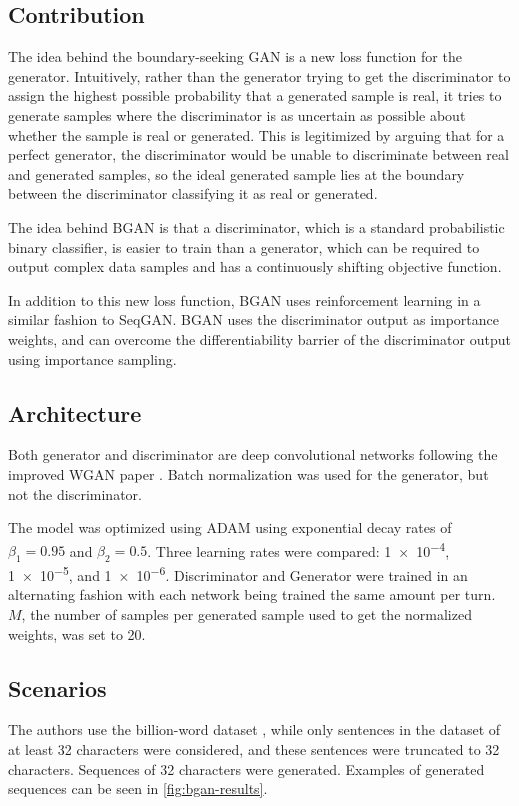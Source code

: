 \documentclass[a4paper,conference]{IEEEtran}
\begin{document}
\subsection{Contribution}
The idea behind the boundary-seeking GAN is a new loss function for the generator. Intuitively, rather than the generator trying to get the discriminator to assign the highest possible probability that a generated sample is real, it tries to generate samples where the discriminator is as uncertain as possible about whether the sample is real or generated. This is legitimized by arguing that for a perfect generator, the discriminator would be unable to discriminate between real and generated samples, so the ideal generated sample lies at the boundary between the discriminator classifying it as real or generated.

The idea behind BGAN is that a discriminator, which is a standard probabilistic binary classifier, is easier to train than a generator, which can be required to output complex data samples and has a continuously shifting objective function. 

In addition to this new loss function, BGAN uses reinforcement learning in a similar fashion to SeqGAN. BGAN uses the discriminator output as importance weights, and can overcome the differentiability barrier of the discriminator output using importance sampling.

\subsection{Architecture}
Both generator and discriminator are deep convolutional networks following the improved WGAN paper \cite{c21}. Batch normalization \cite{c22} was used for the generator, but not the discriminator. 

The model was optimized using ADAM \cite{c16} using exponential decay rates of $\beta_1 = 0.95$ and $\beta_2 = 0.5$. Three learning rates were compared: \num{1e-4}, \num{1e-5}, and \num{1e-6}. Discriminator and Generator were trained in an alternating fashion with each network being trained the same amount per turn. $M$, the number of samples per generated sample used to get the normalized weights, was set to 20.

\subsection{Scenarios}
The authors use the billion-word dataset \cite{c20}, while only sentences in the dataset of at least 32 characters were considered, and these sentences were truncated to 32 characters. Sequences of 32 characters were generated. Examples of generated sequences can be seen in \ref{fig:bgan-results}.
\end{document}
